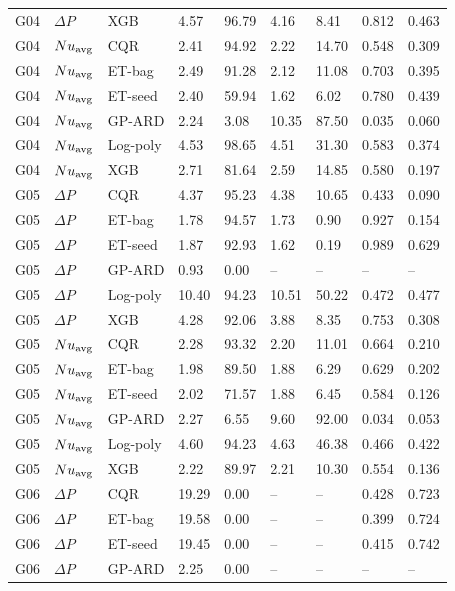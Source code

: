 \begin{longtable}{lllllllll}
G04 & $\Delta P$ & XGB & 4.57 & 96.79 & 4.16 & 8.41 & 0.812 & 0.463\\
G04 & $Nu_{\rm avg}$ & CQR & 2.41 & 94.92 & 2.22 & 14.70 & 0.548 & 0.309\\
G04 & $Nu_{\rm avg}$ & ET-bag & 2.49 & 91.28 & 2.12 & 11.08 & 0.703 & 0.395\\
G04 & $Nu_{\rm avg}$ & ET-seed & 2.40 & 59.94 & 1.62 & 6.02 & 0.780 & 0.439\\
G04 & $Nu_{\rm avg}$ & GP-ARD & 2.24 & 3.08 & 10.35 & 87.50 & 0.035 & 0.060\\
G04 & $Nu_{\rm avg}$ & Log-poly & 4.53 & 98.65 & 4.51 & 31.30 & 0.583 & 0.374\\
G04 & $Nu_{\rm avg}$ & XGB & 2.71 & 81.64 & 2.59 & 14.85 & 0.580 & 0.197\\
G05 & $\Delta P$ & CQR & 4.37 & 95.23 & 4.38 & 10.65 & 0.433 & 0.090\\
G05 & $\Delta P$ & ET-bag & 1.78 & 94.57 & 1.73 & 0.90 & 0.927 & 0.154\\
G05 & $\Delta P$ & ET-seed & 1.87 & 92.93 & 1.62 & 0.19 & 0.989 & 0.629\\
G05 & $\Delta P$ & GP-ARD & 0.93 & 0.00 & -- & -- & -- & --\\
G05 & $\Delta P$ & Log-poly & 10.40 & 94.23 & 10.51 & 50.22 & 0.472 & 0.477\\
G05 & $\Delta P$ & XGB & 4.28 & 92.06 & 3.88 & 8.35 & 0.753 & 0.308\\
G05 & $Nu_{\rm avg}$ & CQR & 2.28 & 93.32 & 2.20 & 11.01 & 0.664 & 0.210\\
G05 & $Nu_{\rm avg}$ & ET-bag & 1.98 & 89.50 & 1.88 & 6.29 & 0.629 & 0.202\\
G05 & $Nu_{\rm avg}$ & ET-seed & 2.02 & 71.57 & 1.88 & 6.45 & 0.584 & 0.126\\
G05 & $Nu_{\rm avg}$ & GP-ARD & 2.27 & 6.55 & 9.60 & 92.00 & 0.034 & 0.053\\
G05 & $Nu_{\rm avg}$ & Log-poly & 4.60 & 94.23 & 4.63 & 46.38 & 0.466 & 0.422\\
G05 & $Nu_{\rm avg}$ & XGB & 2.22 & 89.97 & 2.21 & 10.30 & 0.554 & 0.136\\
G06 & $\Delta P$ & CQR & 19.29 & 0.00 & -- & -- & 0.428 & 0.723\\
G06 & $\Delta P$ & ET-bag & 19.58 & 0.00 & -- & -- & 0.399 & 0.724\\
G06 & $\Delta P$ & ET-seed & 19.45 & 0.00 & -- & -- & 0.415 & 0.742\\
G06 & $\Delta P$ & GP-ARD & 2.25 & 0.00 & -- & -- & -- & --\\

\end{longtable}
